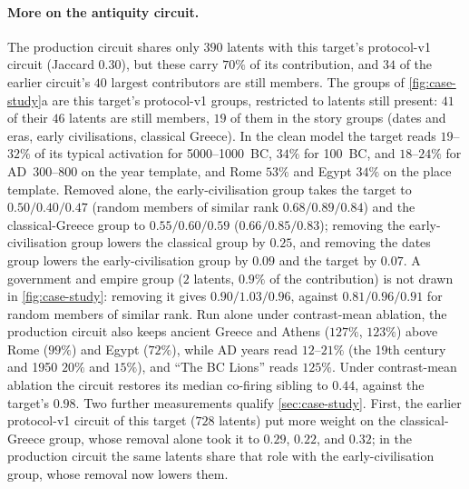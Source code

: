 \documentclass[10pt]{article}
\begin{document}
\paragraph{More on the antiquity circuit.}
The production circuit shares only $390$ latents with this target's protocol-v1 circuit (Jaccard $0.30$), but these carry $70\%$ of its contribution, and $34$ of the earlier circuit's $40$ largest contributors are still members.
The groups of \cref{fig:case-study}a are this target's protocol-v1 groups, restricted to latents still present: $41$ of their $46$ latents are still members, $19$ of them in the story groups (dates and eras, early civilisations, classical Greece).
In the clean model the target reads $19$--$32\%$ of its typical activation for 5000--1000~BC, $34\%$ for 100~BC, and $18$--$24\%$ for AD~300--800 on the year template, and Rome $53\%$ and Egypt $34\%$ on the place template.
Removed alone, the early-civilisation group takes the target to $0.50 / 0.40 / 0.47$ (random members of similar rank $0.68 / 0.89 / 0.84$) and the classical-Greece group to $0.55 / 0.60 / 0.59$ ($0.66 / 0.85 / 0.83$); removing the early-civilisation group lowers the classical group by $0.25$, and removing the dates group lowers the early-civilisation group by $0.09$ and the target by $0.07$.
A government and empire group ($2$ latents, $0.9\%$ of the contribution) is not drawn in \cref{fig:case-study}: removing it gives $0.90 / 1.03 / 0.96$, against $0.81 / 0.96 / 0.91$ for random members of similar rank.
Run alone under contrast-mean ablation, the production circuit also keeps ancient Greece and Athens ($127\%$, $123\%$) above Rome ($99\%$) and Egypt ($72\%$), while AD years read $12$--$21\%$ (the 19th century and 1950 $20\%$ and $15\%$), and ``The BC Lions'' reads $125\%$.
Under contrast-mean ablation the circuit restores its median co-firing sibling to $0.44$, against the target's $0.98$.
Two further measurements qualify \cref{sec:case-study}.
First, the earlier protocol-v1 circuit of this target ($728$ latents) put more weight on the classical-Greece group, whose removal alone took it to $0.29$, $0.22$, and $0.32$; in the production circuit the same latents share that role with the early-civilisation group, whose removal now lowers them.
\end{document}
